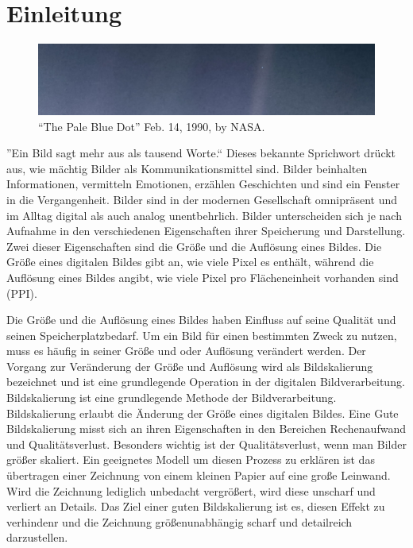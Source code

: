 \chapter{Einleitung}

\begin{center}
\begin{figure}[h]
    \includegraphics[width=\textwidth]{img/PIA23645_PaleBlueDotRevisited_1600.jpg}
    \caption{``The Pale Blue Dot'' Feb. 14, 1990, by NASA\footnotemark.}
    \label{fig:my_label}
\end{figure}
\end{center}

''Ein Bild sagt mehr aus als tausend Worte.`` Dieses bekannte Sprichwort drückt aus, wie mächtig Bilder als Kommunikationsmittel sind. 
Bilder beinhalten Informationen, vermitteln Emotionen, erzählen Geschichten und sind ein Fenster in die Vergangenheit. 
Bilder sind in der modernen Gesellschaft omnipräsent und im Alltag digital als auch analog unentbehrlich.
Bilder unterscheiden sich je nach Aufnahme in den verschiedenen Eigenschaften ihrer Speicherung und Darstellung. 
Zwei dieser Eigenschaften sind die Größe und die Auflösung eines Bildes. 
Die Größe eines digitalen Bildes gibt an, wie viele Pixel es enthält, während die Auflösung eines Bildes angibt, wie viele Pixel pro Flächeneinheit vorhanden sind (\ac{PPI}). 

Die Größe und die Auflösung eines Bildes haben Einfluss auf seine Qualität und seinen Speicherplatzbedarf. 
Um ein Bild für einen bestimmten Zweck zu nutzen, muss es häufig in seiner Größe und oder Auflösung verändert werden. 
Der Vorgang zur Veränderung der Größe und Auflösung wird als Bildskalierung bezeichnet und ist eine grundlegende Operation in der digitalen Bildverarbeitung.
Bildskalierung ist eine grundlegende Methode der Bildverarbeitung. Bildskalierung erlaubt die Änderung der Größe eines digitalen Bildes.
Eine Gute Bildskalierung misst sich an ihren Eigenschaften in den Bereichen Rechenaufwand und Qualitätsverlust. 
Besonders wichtig ist der Qualitätsverlust, wenn man Bilder größer skaliert. 
Ein geeignetes Modell um diesen Prozess zu erklären ist das übertragen einer Zeichnung von einem kleinen Papier auf eine große Leinwand. 
Wird die Zeichnung lediglich unbedacht vergrößert, wird diese unscharf und verliert an Details. 
Das Ziel einer guten Bildskalierung ist es, diesen Effekt zu verhindenr und die Zeichnung größenunabhängig scharf und detailreich darzustellen.

